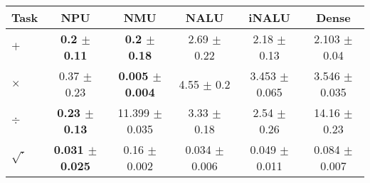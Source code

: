 \begin{tabular}{lccccc}
\toprule
Task & NPU & NMU & NALU & iNALU & Dense\\
\midrule
$+$  & \textbf{0.2 $\pm$ 0.11} & \textbf{0.2 $\pm$ 0.18} & 2.69 $\pm$ 0.22 & 2.18 $\pm$ 0.13 & 2.103 $\pm$ 0.04 \\
$\times$ & 0.37 $\pm$ 0.23 & \textbf{0.005 $\pm$ 0.004} & 4.55 $\pm$ 0.2 & 3.453 $\pm$ 0.065 & 3.546 $\pm$ 0.035 \\
$\div$  & \textbf{0.23 $\pm$ 0.13} & 11.399 $\pm$ 0.035 & 3.33 $\pm$ 0.18 & 2.54 $\pm$ 0.26 & 14.16 $\pm$ 0.23 \\
$\sqrt{\cdot}$ & \textbf{0.031 $\pm$ 0.025} & 0.16 $\pm$ 0.002 & 0.034 $\pm$ 0.006 & 0.049 $\pm$ 0.011 & 0.084 $\pm$ 0.007 \\
\bottomrule
\end{tabular}
